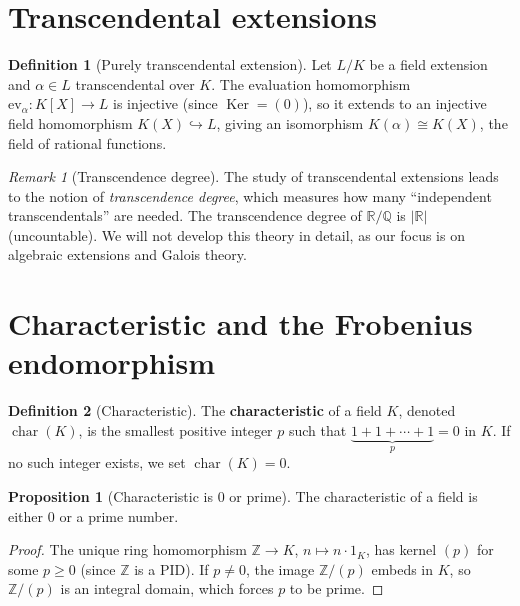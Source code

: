 \documentclass[12pt,a4paper,openany]{book}
\theoremstyle{definition}
\newtheorem{definition}{Definition}[chapter]
\newtheorem{proposition}{Proposition}[chapter]
\theoremstyle{remark}
\newtheorem{remark}{Remark}[chapter]
\newcommand{\Z}{\mathbb{Z}}
\newcommand{\Q}{\mathbb{Q}}
\newcommand{\R}{\mathbb{R}}
\DeclareMathOperator{\Ker}{Ker}
\DeclareMathOperator{\chr}{char}
\begin{document}
\section{Transcendental extensions}
\label{sec:transcendental-extensions}

\begin{definition}[Purely transcendental extension]
\label{def:purely-transcendental}
Let $L/K$ be a field extension and $\alpha \in L$ transcendental
over $K$. The evaluation homomorphism
$\mathrm{ev}_\alpha \colon K[X] \to L$ is injective (since
$\Ker = (0)$), so it extends to an injective field homomorphism
$K(X) \hookrightarrow L$, giving an isomorphism
$K(\alpha) \cong K(X)$, the field of rational functions.
\end{definition}

\begin{remark}[Transcendence degree]
\label{rem:transcendence-degree}
The study of transcendental extensions leads to the notion of
\emph{transcendence degree}, which measures how many ``independent
transcendentals'' are needed. The transcendence degree of
$\R/\Q$ is $|\R|$ (uncountable). We will not develop this theory
in detail, as our focus is on algebraic extensions and Galois theory.
\end{remark}

\section{Characteristic and the Frobenius endomorphism}
\label{sec:characteristic-frobenius}

\begin{definition}[Characteristic]
\label{def:characteristic}
The \textbf{characteristic} of a field $K$, denoted $\chr(K)$, is
the smallest positive integer $p$ such that
$\underbrace{1 + 1 + \cdots + 1}_{p} = 0$ in $K$. If no such integer
exists, we set $\chr(K) = 0$.
\end{definition}

\begin{proposition}[Characteristic is $0$ or prime]
\label{prop:char-prime}
The characteristic of a field is either $0$ or a prime number.
\end{proposition}

\begin{proof}
The unique ring homomorphism $\Z \to K$, $n \mapsto n \cdot 1_K$, has
kernel $(p)$ for some $p \ge 0$ (since $\Z$ is a PID). If $p \ne 0$,
the image $\Z/(p)$ embeds in $K$, so $\Z/(p)$ is an integral domain,
which forces $p$ to be prime.
\end{proof}
\end{document}
